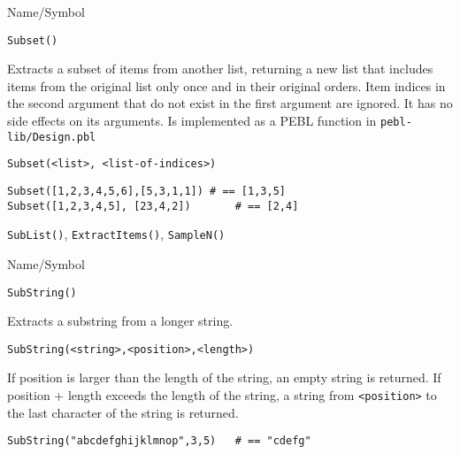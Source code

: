\begin{desc}{Name/Symbol}
\item[Name/Symbol]  	\verb+Subset()+

\item[Description] Extracts a subset of items from another list,
  returning a new list that includes items from the original list only
  once and in their original orders.  Item indices in the second
  argument that do not exist in the first argument are ignored.  It
  has no side effects on its arguments.  Is implemented as a PEBL
  function in \verb+pebl-lib/Design.pbl+

\item[Usage]       	
\begin{verbatim}
Subset(<list>, <list-of-indices>)
\end{verbatim}

\item[Example]     	
\begin{verbatim}
Subset([1,2,3,4,5,6],[5,3,1,1])	# == [1,3,5]
Subset([1,2,3,4,5], [23,4,2])		# == [2,4]
\end{verbatim}

\item[See Also]   	\verb+SubList()+, \verb+ExtractItems()+, \verb+SampleN()+
\end{desc}

\rl


\begin{desc}{Name/Symbol}
\item[Name/Symbol]  	\verb+SubString()+

\item[Description]  	Extracts a substring from a longer string.

\item[Usage]
\begin{verbatim}
SubString(<string>,<position>,<length>)
\end{verbatim}
  If position is larger than the length of the string, an empty string
  is returned.  If position + length exceeds the length of the string,
  a string from \verb+<position>+ to the last character of the string
  is returned.

\item[Example]
\begin{verbatim}
SubString("abcdefghijklmnop",3,5)	# == "cdefg"
\end{verbatim}

\item[See Also]	
\end{desc}

